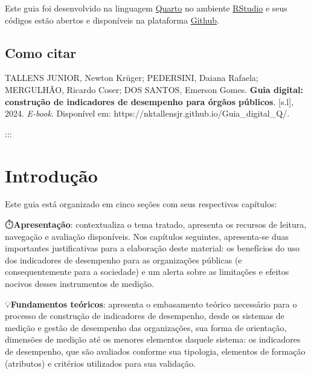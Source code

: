 \documentclass[
  letterpaper,
  DIV=11,
  numbers=noendperiod]{scrreprt}
\begin{document}

Este guia foi desenvolvido na linguagem
\href{https://quarto.org/}{Quarto} no ambiente
\href{https://posit.co/products/open-source/rstudio/}{RStudio} e seus
códigos estão abertos e disponíveis na plataforma
\href{https://github.com/}{Github}.

\hypertarget{como-citar}{%
\section*{Como citar}\label{como-citar}}


TALLENS JUNIOR, Newton Krüger; PEDERSINI, Daiana Rafaela; MERGULHÃO,
Ricardo Coser; DOS SANTOS, Emerson Gomes. \textbf{Guia digital:
construção de indicadores de desempenho para órgãos públicos}.
{[}s.l{]}, 2024. \emph{E-book}. Disponível em:
https://nktallensjr.github.io/Guia\_digital\_Q/.

:::


\hypertarget{introduuxe7uxe3o}{%
\chapter*{Introdução}\label{introduuxe7uxe3o}}


Este guia está organizado em cinco seções com seus respectivos
capítulos:

⏱️\textbf{Apresentação}: contextualiza o tema tratado, apresenta os
recursos de leitura, navegação e avaliação disponíveis. Nos capítulos
seguintes, apresenta-se duas importantes justificativas para a
elaboração deste material: os benefícios do uso dos indicadores de
desempenho para as organizações públicas (e consequentemente para a
sociedade) e um alerta sobre as limitações e efeitos nocivos desses
instrumentos de medição.

💡\textbf{Fundamentos teóricos}: apresenta o embasamento teórico
necessário para o processo de construção de indicadores de desempenho,
desde os sistemas de medição e gestão de desempenho das organizações,
sua forma de orientação, dimensões de medição até os menores elementos
daquele sistema: os indicadores de desempenho, que são avaliados
conforme sua tipologia, elementos de formação (atributos) e critérios
utilizados para sua validação.
\end{document}
